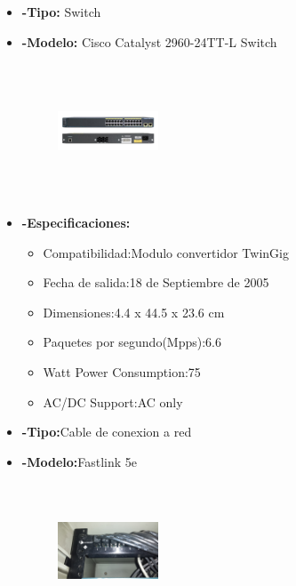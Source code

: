 \documentclass{udpreport}
\begin{document}
\begin{itemize}
\begin{itemize}
		\end{itemize}
		\item{\bf-Tipo:} Switch\\
		\item{\bf-Modelo:} Cisco Catalyst 2960-24TT-L Switch\\
		\begin{figure}[h]
    		\centering
    	\includegraphics[width=3cm, height=4cm]{switch.jpg}
		\end{figure}
		\item{\bf-Especificaciones:}
		\begin{itemize}
			\item Compatibilidad:Modulo convertidor TwinGig\\
			\item Fecha de salida:18 de Septiembre de 2005\\
			\item Dimensiones:4.4 x 44.5 x 23.6 cm\\
			\item Paquetes por segundo(Mpps):6.6\\
			\item Watt Power Consumption:75\\
			\item AC/DC Support:AC only\\
		\end{itemize}
		\item{\bf-Tipo:}Cable de conexion a red\\
		\item{\bf-Modelo:}Fastlink 5e\\
		\begin{figure}[h]
    		\centering
    	\includegraphics[width=3cm, height=4cm]{cablecat5e.jpg}

\end{figure}
\end{itemize}
\end{document}
